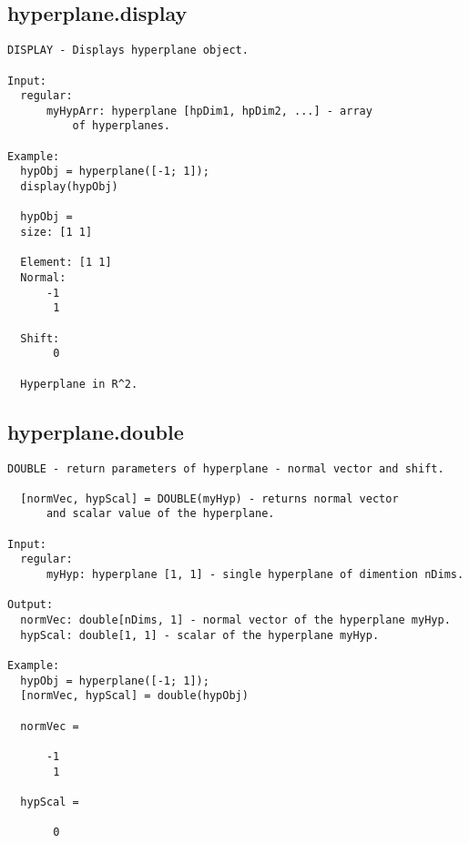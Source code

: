 \subsection{\texorpdfstring{hyperplane.display}{display}}\label{method:hyperplane.display}
\begin{verbatim}
DISPLAY - Displays hyperplane object.

Input:
  regular:
      myHypArr: hyperplane [hpDim1, hpDim2, ...] - array
          of hyperplanes.

Example:
  hypObj = hyperplane([-1; 1]);
  display(hypObj)

  hypObj =
  size: [1 1]

  Element: [1 1]
  Normal:
      -1
       1

  Shift:
       0

  Hyperplane in R^2.
\end{verbatim}
\subsection{\texorpdfstring{hyperplane.double}{double}}\label{method:hyperplane.double}
\begin{verbatim}
DOUBLE - return parameters of hyperplane - normal vector and shift.

  [normVec, hypScal] = DOUBLE(myHyp) - returns normal vector
      and scalar value of the hyperplane.

Input:
  regular:
      myHyp: hyperplane [1, 1] - single hyperplane of dimention nDims.

Output:
  normVec: double[nDims, 1] - normal vector of the hyperplane myHyp.
  hypScal: double[1, 1] - scalar of the hyperplane myHyp.

Example:
  hypObj = hyperplane([-1; 1]);
  [normVec, hypScal] = double(hypObj)

  normVec =

      -1
       1

  hypScal =

       0
\end{verbatim}
